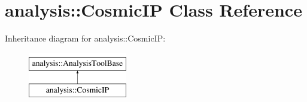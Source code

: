 \hypertarget{classanalysis_1_1CosmicIP}{\section{analysis\-:\-:Cosmic\-I\-P Class Reference}
\label{classanalysis_1_1CosmicIP}
}
Inheritance diagram for analysis\-:\-:Cosmic\-I\-P\-:\begin{figure}[H]
\begin{center}
\leavevmode
\includegraphics[height=2.000000cm]{classanalysis_1_1CosmicIP}
\end{center}
\end{figure}
